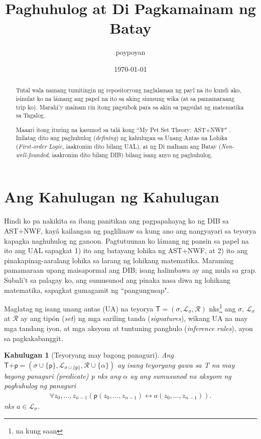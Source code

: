 \documentclass{article}
\title{Paghuhulog at Di Pagkamainam ng Batay}
\author{poypoyan}
\date{\petsa\today}
\newtheorem{definition}{Kahulugan}[section]
\begin{document}
\maketitle

\begin{abstract}
Tutal wala namang tumitingin ng repositoryong naglalaman ng payl na ito kundi ako, isinulat ko na lámang ang papel na ito sa aking sinusung wika (at sa pamamaraang trip ko). Marahi'y mainam rin itong pagsubok para sa akin sa pagsulat ng matematika sa Tagalog.

Maaari itong ituring na kasunod sa talâ kong ``My Pet Set Theory: \textsf{AST+NWF}" \cite{ast-nwf}. Inilatag dito ang paghuhulog (\textit{defining}) ng kahulugan sa Unang Antas na Lohika (\textit{First-order Logic}, iaakronim dito bilang UAL), at ng Di maInam ang Batay (\textit{Non-well-founded}, iaakronim dito bilang DIB) bilang isang anyo ng paghuhulog.
\end{abstract}

\section{Ang Kahulugan ng Kahulugan}

Hindi ko pa nakikita sa ibang panitikan ang pagpapahayag ko ng DIB sa \textsf{AST+NWF}, kayâ kailangan ng paglilinaw sa kung ano ang nangyayari sa teyorya kapagka naghuhulog ng ganoon. Pagtutuunan ko lámang ng pansin sa papel na ito ang UAL sapagkat 1) ito ang batayang lohika ng \textsf{AST+NWF}, at 2) ito ang pinakapinag-aaralang lohika sa larang ng lohikang matematika. Maraming pamamaraan upang maisapormal ang DIB; isang halimbawa ay ang mula sa grap. Subali't sa palagay ko, ang sumusunod ang pinaka nasa diwa ng lohikang matematika, sapagkat gumagamit ng ``pangungusap".

Maglatag ng isang unang antas (UA) na teyorya $\textsf{T} = (\sigma, \mathcal{L}_\sigma, \mathcal{R})$ nks\footnote{na kung saan} ang $\sigma$, $\mathcal{L}_\sigma$ at $\mathcal{R}$ ay ang tipón (\textit{set}) ng mga sariling tanda (\textit{signatures}), wikang UA na may mga tandang iyon, at mga aksyom at tuntuning panghulo (\textit{inference rules}), ayon sa pagkakabanggit.

\begin{definition}[Teyoryang may bagong panaguri]
\label{paghuhulog}
Ang $\textsf{T+p} = (\sigma \cup \{\textsf{p}\}, \mathcal{L}_{\sigma \cup \{\textsf{p}\}}, \mathcal{R} \cup \{\alpha\})$ ay isang teyoryang gawa sa \textsf{T} na may bagong panaguri (\textit{predicate}) \textsf{p} nks ang $\alpha$ ay ang sumusunod na aksyom ng paghuhulog ng panaguri
\begin{align}
\forall z_0, \ldots, z_{n-1}(\textsf{p}(z_0, \ldots, z_{n-1}) \leftrightarrow a(z_0, \ldots, z_{n-1})).
\end{align}
nks $a \in \mathcal{L}_\sigma$.
\end{definition}
\end{document}

